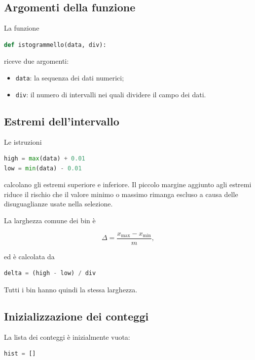 \documentclass[11pt,a4paper]{book}
\begin{document}
\subsection{Argomenti della funzione}

La funzione

\begin{lstlisting}[language=Python]
def istogrammello(data, div):
\end{lstlisting}

riceve due argomenti:

\begin{itemize}
    \item \texttt{data}: la sequenza dei dati numerici;
    \item \texttt{div}: il numero di intervalli nei quali dividere il
          campo dei dati.
\end{itemize}

\subsection{Estremi dell'intervallo}

Le istruzioni

\begin{lstlisting}[language=Python]
high = max(data) + 0.01
low = min(data) - 0.01
\end{lstlisting}

calcolano gli estremi superiore e inferiore. Il piccolo margine aggiunto
agli estremi riduce il rischio che il valore minimo o massimo rimanga
escluso a causa delle disuguaglianze usate nella selezione.

La larghezza comune dei bin è

\[
\Delta = \frac{x_{\max}-x_{\min}}{m},
\]

ed è calcolata da

\begin{lstlisting}[language=Python]
delta = (high - low) / div
\end{lstlisting}

Tutti i bin hanno quindi la stessa larghezza.

\subsection{Inizializzazione dei conteggi}

La lista dei conteggi è inizialmente vuota:

\begin{lstlisting}[language=Python]
hist = []
\end{lstlisting}
\end{document}
